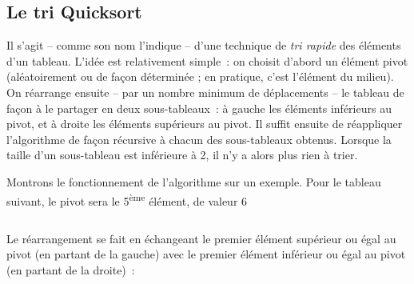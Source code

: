 
	\subsection{Le tri Quicksort}
	
		Il s'agit -- comme son nom l'indique -- d'une technique de 
		\textit{tri rapide} des éléments d'un tableau. L'idée est
		relativement simple~: on choisit d'abord un élément pivot 
		(aléatoirement ou de façon déterminée ; en pratique, c'est
		l'élément du milieu). On réarrange ensuite -- par un nombre 
		minimum de déplacements -- le tableau de façon à le partager 
		en deux sous-tableaux~: à gauche les éléments inférieurs au 
		pivot, et à droite les éléments supérieurs au pivot. Il suffit 
		ensuite de réappliquer l'algorithme de façon récursive à chacun 
		des sous-tableaux obtenus. Lorsque la taille d'un sous-tableau 
		est inférieure à 2, il n'y a alors plus rien à trier.

		Montrons le fonctionnement de l'algorithme sur un exemple. 
		Pour le tableau suivant, le pivot sera le 5\textsuperscript{ème} 
		élément, de valeur 6~

		\begin{center}
			\tablefirsthead{}
			\tablehead{}
			\tabletail{}
			\tablelasttail{}
			\begin{supertabular}{|m{1.171cm}|m{1.206cm}|m{1.206cm}|m{1.206cm}|m{1.206cm}|m{1.206cm}|m{1.206cm}|m{1.206cm}|m{1.206cm}|m{1.232cm}|}
			\hline
			 &
			 &
			 &
			 &
			 &
			 &
			 &
			 &
			 &
			\centering{}\\\hline
			\end{supertabular}
		\end{center}

		Le réarrangement se fait en échangeant le premier élément supérieur 
		ou égal au pivot (en partant de la gauche) avec le premier élément 
		inférieur ou égal au pivot (en partant de la droite)~:

